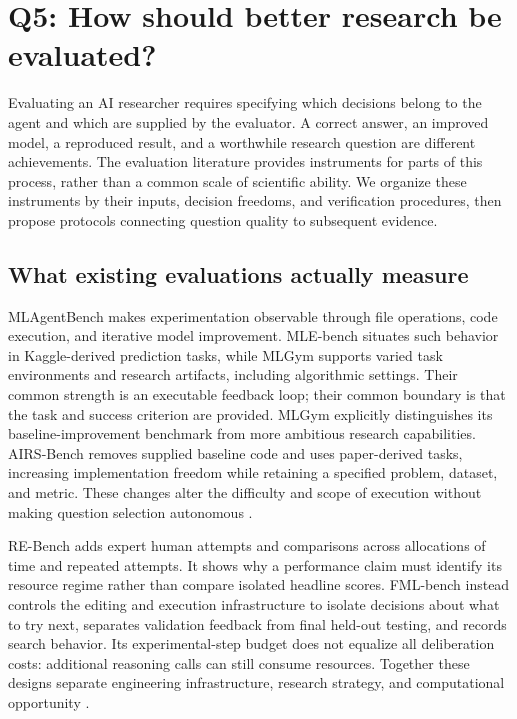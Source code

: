 \section{Q5: How should better research be evaluated?}
\label{sec:evaluation}

Evaluating an AI researcher requires specifying which decisions belong to the agent and which are supplied by the evaluator. A correct answer, an improved model, a reproduced result, and a worthwhile research question are different achievements. The evaluation literature provides instruments for parts of this process, rather than a common scale of scientific ability. We organize these instruments by their inputs, decision freedoms, and verification procedures, then propose protocols connecting question quality to subsequent evidence.

\subsection{What existing evaluations actually measure}

MLAgentBench makes experimentation observable through file operations, code execution, and iterative model improvement. MLE-bench situates such behavior in Kaggle-derived prediction tasks, while MLGym supports varied task environments and research artifacts, including algorithmic settings. Their common strength is an executable feedback loop; their common boundary is that the task and success criterion are provided. MLGym explicitly distinguishes its baseline-improvement benchmark from more ambitious research capabilities. AIRS-Bench removes supplied baseline code and uses paper-derived tasks, increasing implementation freedom while retaining a specified problem, dataset, and metric. These changes alter the difficulty and scope of execution without making question selection autonomous \cite{mlagentbench,mle-bench,mlgym,airs-bench}.

RE-Bench adds expert human attempts and comparisons across allocations of time and repeated attempts. It shows why a performance claim must identify its resource regime rather than compare isolated headline scores. FML-bench instead controls the editing and execution infrastructure to isolate decisions about what to try next, separates validation feedback from final held-out testing, and records search behavior. Its experimental-step budget does not equalize all deliberation costs: additional reasoning calls can still consume resources. Together these designs separate engineering infrastructure, research strategy, and computational opportunity \cite{re-bench,fml-bench}.

